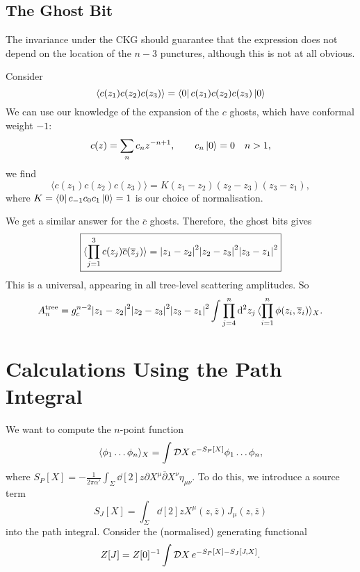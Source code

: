 \subsection{The Ghost Bit}%
\label{sub:the_ghost_bit}

The invariance under the CKG should guarantee that the expression does not depend on the location of the $n -3$ punctures, although this is not at all obvious.

Consider
\begin{equation}
  \langle c(z_1) c(z_2) c(z_3) \rangle =  \bra{0} c(z_1) c(z_2) c(z_3) \ket{0}
\end{equation}
We can use our knowledge of the expansion of the $c$ ghosts, which have conformal weight $-1$:
\begin{equation}
  c(z) = \sum_{n} c_n z^{-n + 1}, \qquad c_n \ket{0} = 0 \quad n > 1,
\end{equation}
we find
\begin{equation}
  \langle c(z_1) c(z_2) c(z_3) \rangle = K (z_1 - z_2) (z_2 - z_3) (z_3 - z_1),
\end{equation}
where $K = \bra{0} c_{-1} c_0 c_1 \ket{0} = 1$ is our choice of normalisation.

We get a similar answer for the $\overline{c}{}$ ghosts.
Therefore, the ghost bits gives
\begin{equation}
  \boxed{ \langle \prod_{j=1}^{3} c(z_j) \overline{c}{}(\overline{z}{}_j) \rangle = \abs{z_1 - z_2}^2 \abs{z_2 - z_3}^2 \abs{z_3 - z_1}^2 }
\end{equation}
This is a universal, appearing in all tree-level scattering amplitudes.
So 
\begin{equation}
  A_n^{\text{tree}} = g_c^{n-2} \abs{z_1 - z_2}^2 \abs{z_2 - z_3}^2 \abs{z_3 - z_1}^2 \int \prod_{j=4}^{n} \dd[2]{z_j} \langle \prod_{i=1}^{n} \phi(z_i, \overline{z}{}_i) \rangle_X.
\end{equation}

\section{Calculations Using the Path Integral}%
\label{sec:calculating_using_the_path_integral}

We want to compute the $n$-point function
\begin{equation}
  \label{eq:n-pt}
  \langle \phi_1 \dots \phi_n \rangle_X = \int \mathop{\mathcal{D} X} e^{-S_P[X]} \phi_1 \dots \phi_n,
\end{equation}
where $S_P[X] = -\frac{1}{2\pi \alpha'} \int_{\Sigma} \dd[2]{z} \partial X^{\mu} \overline{\partial}{} X^{\nu} \eta_{\mu\nu}$.
To do this, we introduce a source term 
\begin{equation}
  S_J[X] = \int_{\Sigma} \dd[2]{z} X^{\mu} (z, \overline{z}{}) J_{\mu} (z, \overline{z}{})
\end{equation}
into the path integral. Consider the (normalised) generating functional
\begin{equation}
  Z [J] = Z[0]^{-1} \int \mathop{\mathcal{D} X} e^{-S_P[X] - S_J[J, X]}.
\end{equation}
